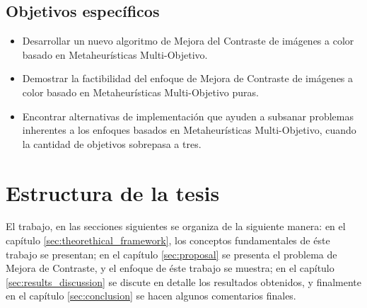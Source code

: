 \subsection{Objetivos específicos}
\begin{itemize}

	\item Desarrollar un nuevo algoritmo de Mejora del Contraste de imágenes a color basado en Metaheurísticas Multi-Objetivo.

	\item Demostrar la factibilidad del enfoque de Mejora de Contraste de imágenes a color basado en Metaheurísticas Multi-Objetivo puras.

	\item Encontrar alternativas de implementación que ayuden a subsanar problemas inherentes a los enfoques basados en Metaheurísticas Multi-Objetivo, cuando la cantidad de objetivos sobrepasa a tres.







\end{itemize}

\section{Estructura de la tesis}
El trabajo, en las secciones siguientes se organiza de la siguiente manera: en el capítulo \ref{sec:theorethical_framework}, los conceptos fundamentales de éste trabajo se presentan; en el capítulo \ref{sec:proposal} se presenta el problema de Mejora de Contraste, y el enfoque de éste trabajo se muestra; en el capítulo \ref{sec:results_discussion} se discute en detalle los resultados obtenidos, y finalmente en el capítulo \ref{sec:conclusion} se hacen algunos comentarios finales.
